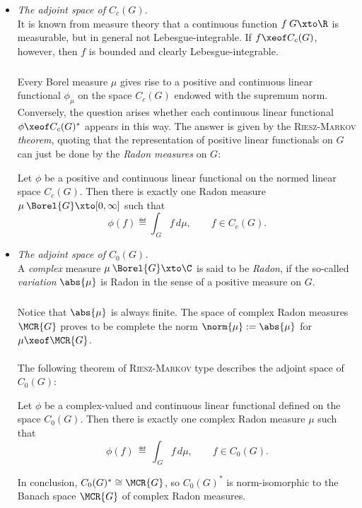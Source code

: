 \documentclass[11pt,twoside]{article}
\def\G{G}
\begin{document}
\begin{itemize}[leftmargin=12pt,itemsep=5pt]
\item[1.] \textit{The adjoint space of $C_c(\G)$.}\\
It is known from measure theory
that a continuous function $f\:\G \xto \R$ is measurable,
but in general not Lebesgue-integrable.
If $f \xeof C_c(\G)$,
however,
then $f$ is bounded and clearly Lebesgue-integrable.

\subparagraph{} %
Every Borel measure $\mu$ gives rise to
a positive and continuous linear functional $\phi_{\mu}$
on the space $C_c(\G)$ endowed with the supremum norm.
Conversely,
the question arises
whether each continuous linear functional $\phi \xeof C_c(\G)^*$
appears in this way.
The answer is given by the \textsc{Riesz-Markov} \textit{theorem},
quoting
that the representation of positive linear functionals on $\G$
can just be done by the \textit{Radon measures} on $\G$:

\begin{theorem1}\label{IV_RIESZ-MARKOV_THEOREM_1}
Let $\phi$ be a positive and continuous linear functional
on the normed linear space $C_c(\G)$.
Then there is exactly one Radon measure
$\mu\:\Borel{\G} \xto [0,\infty]$ such that
\[
\phi(f) \eqdef \int_{\,\G} f \, d\mu, \quad \quad f \in C_c(\G).
\]
\end{theorem1}

\item[2.] \textit{The adjoint space of $C_0(\G)$.}\\
A \textit{complex} measure $\mu \: \Borel{\G} \xto \C$
is said to be \textit{Radon},
if the so-called \textit{variation} $\abs{\mu} $
is Radon in the sense of a positive measure on $\G$.

\subparagraph{}
Notice that $\abs{\mu} $ is always finite.
The space of complex Radon measures $\MCR{\G}$
proves to be complete {\wrt} the norm $\norm{\mu} := \abs{\mu} $
for $\mu \xeof \MCR{\G}$.

\paragraph{} %
The following theorem of \textsc{Riesz-Markov} type
describes the adjoint space of $C_0(\G)$:

\begin{theorem1}\label{IV_RIESZ_MARKOV-THEOREM_2}
Let $\phi$ be a complex-valued and continuous linear functional
defined on the space $C_0(\G)$.
Then there is exactly one complex Radon measure $\mu$ such that
\[
\phi(f) \, \eqdef \, \int_{\,\G} f \, d\mu, \quad \quad f \in C_0(\G).
\]
\end{theorem1}
In conclusion,
$C_0(\G)^* \cong \MCR{\G}$,
so $C_0(\G)^*$ is norm-isomorphic to the Banach space $\MCR{\G}$
of complex Radon measures.


\end{itemize}
\end{document}
